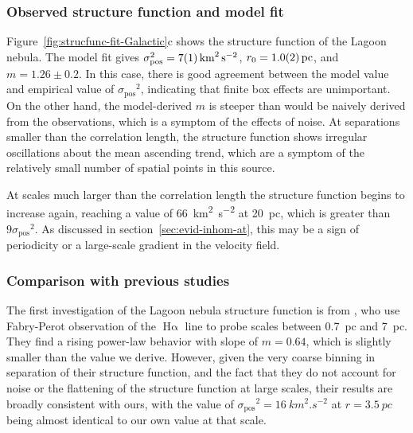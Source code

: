 \documentclass[fleqn,usenatbib, useAMS, a4paper]{mnras}
\newcommand\startNEW{\color{black}}
\newcommand\stopNEW{\color{black}}
\newcommand\pos{\ensuremath{_{\mathrm{pos}}}}
\newcommand\ha{\ensuremath{\text{H}\upalpha}}
\begin{document}
\startNEW
\subsubsection{Observed structure function and model fit}
\label{sec:observ-struct-funct-lagoon}

Figure~\ref{fig:strucfunc-fit-Galactic}c shows the structure function of the Lagoon nebula.
The model fit gives \(\sigma\pos^2 = \SI{7 \pm 1}{km^{2}.s^{-2}}\), \(r_0 = \SI{1 \pm 0.2}{pc} \), and \(m = 1.26 \pm 0.2\).
In this case, there is good agreement between the model value and empirical value of \(\sigma\pos^2\),
indicating that finite box effects are unimportant.
On the other hand, the model-derived \(m\) is steeper than would be naively derived
from the observations, which is a symptom of the effects  of noise.
At separations smaller than the correlation length, the structure function shows irregular oscillations about the mean ascending trend,
which are a symptom of the relatively small number of spatial points in this source.

At scales much larger than the correlation length
the structure function begins to increase again, reaching a value of \SI{66}{km^{2}.s^{-2}} at \SI{20}{pc},
which is greater than \(9 \sigma\pos^2\).
As discussed in section~\ref{sec:evid-inhom-at}, this may be a sign of periodicity
or a large-scale gradient in the velocity field.
\stopNEW

\startNEW
\subsubsection{Comparison with previous studies}
\label{sec:comparison-lagoon}
The first investigation of the Lagoon nebula structure function is from \citet{1970A&A.....8..486L},
who use Fabry-Perot observation of the \ha{} line to probe scales
between \SI{0.7}{pc} and \SI{7}{pc}.
They find a rising power-law behavior with slope of \(m = 0.64\),
which is slightly smaller than the value we derive.
However, given the very coarse binning in separation of their structure function,
and the fact that they do not account for noise or the flattening of the structure function at large scales,
their results are broadly consistent with ours,
with the value of \( \sigma\pos^2 = \SI{16}{km^{2}.s^{-2}}\) at \(r = \SI{3.5}{pc}\) being almost
identical to our own value at that scale.
\end{document}
